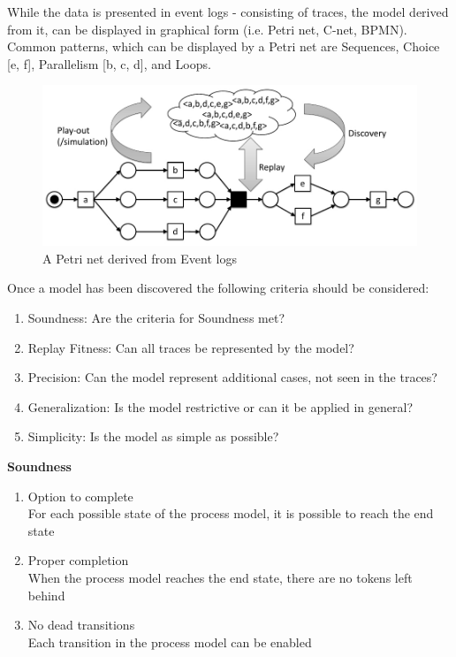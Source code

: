 \noindent While the data is presented in event logs - consisting of traces, the model derived from it, can be displayed in  graphical form (i.e. Petri net, C-net, BPMN). Common patterns, which can be displayed by a Petri net are Sequences, Choice [e, f], Parallelism [b, c, d], and Loops.

\begin{figure}[H]
\includegraphics[width=14cm]{Chapters/Notizen_Graphics/ProcessModel_Behaviour.jpg}
\caption{A Petri net derived from Event logs\protect\cite{Buijs2017}} 
\end{figure}

\noindent Once a model has been discovered the following criteria should be considered:

\begin{enumerate}
\setlength{\itemsep}{3pt}
\item Soundness: Are the criteria for Soundness met?
\item Replay Fitness: Can all traces be represented by the model?
\item Precision: Can the model represent additional cases, not seen in the traces? 
\item Generalization: Is the model restrictive or can it be applied in general?
\item Simplicity: Is the model as simple as possible?
\end{enumerate}

\vspace{5mm}
\textbf{Soundness}
\begin{enumerate}
\setlength{\itemsep}{3pt}
\item{Option to complete}\\
For each possible state of the process model, it is possible to reach the end state

\item{Proper completion}\\
When the process model reaches the end state, there are no tokens left behind

\item{No dead transitions}\\
Each transition in the process model can be enabled\\
\protect\cite{Buijs2017}
\end{enumerate}



